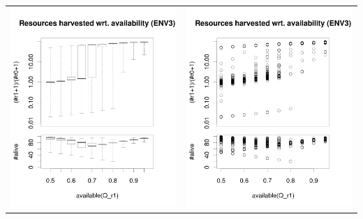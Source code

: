 \documentclass[a4paper,10pt]{article}
\begin{document}
\begin{table}[h!]
\begin{tabular}{cc}
\includegraphics[width=\imgSize]{images/5StaticEnv/ratioAndRep_staticEnv3LogY}&\includegraphics[width=\imgSize]{images/5StaticEnv/ratioAndRep_staticEnvPlot3LogY}\\

\end{tabular}
\end{table}
\end{document}
